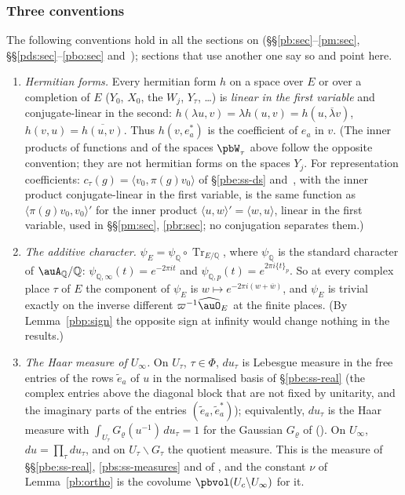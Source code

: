 \documentclass[10pt]{amsart}
\theoremstyle{definition}
\theoremstyle{remark}
\newcommand{\Q}{\mathbb Q}
\providecommand{\auPl}{\Phi}
\providecommand{\aubar}[1]{\overline{#1}}
\begin{document}
\subsubsection*{Three conventions}\label{pb:ss-conv}
The following conventions hold in all the sections on {\cite[Theorem~14.14]{P46}} (\S\S\ref{pb:sec}--\ref{pm:sec},
\S\S\ref{pds:sec}--\ref{pbo:sec} and~{\cite[\S\S2--6]{P52}}); sections that use another one say so and point here.
\begin{enumerate}
\item[(Cv1)] \emph{Hermitian forms.} Every hermitian form $h$ on a space over $E$ or over a completion
of $E$ ($Y_0$, $X_0$, the $W_j$, $Y_\tau$, \dots) is \emph{linear in the first variable} and
conjugate-linear in the second: $h(\lambda u,v)=\lambda h(u,v)=h(u,\aubar\lambda v)$, $h(v,u)=
\aubar{h(u,v)}$. Thus $h(v,e_a^*)$ is the coefficient of $e_a$ in $v$. (The inner products of
functions and of the spaces $\pbW_\tau$ above follow the opposite convention; they are not
hermitian forms on the spaces $Y_j$. For representation coefficients: $c_\tau(g)=\langle v_0,\pi(g)v_0\rangle$
of \S\ref{pbe:ss-ds} and~{\cite[\S3.2]{P49}}, with the inner product conjugate-linear in the first variable, is
the same function as $\langle\pi(g)v_0,v_0\rangle'$ for the inner product $\langle u,w\rangle'=\langle w,u\rangle$,
linear in the first variable, used in \S\S\ref{pm:sec}, \ref{pbr:sec}; no conjugation separates them.)
\item[(Cv2)] \emph{The additive character.} $\psi_E=\psi_\Q\circ\operatorname{Tr}_{E/\Q}$, where
$\psi_\Q$ is the standard character of $\auA_\Q/\Q$: $\psi_{\Q,\infty}(t)=e^{-2\pi it}$ and
$\psi_{\Q,p}(t)=e^{2\pi i\{t\}_p}$. So at every complex place $\tau$ of $E$ the component of $\psi_E$ is
$w\mapsto e^{-2\pi i(w+\aubar w)}$, and $\psi_E$ is trivial exactly on the inverse different
$\varpi^{-1}\widehat\auO_E$ at the finite places. (By Lemma~\ref{pbp:sign} the opposite sign at
infinity would change nothing in the results.)
\item[(Cv3)] \emph{The Haar measure of $U_\infty$.} On $U_\tau$, $\tau\in\auPl$, $du_\tau$ is
Lebesgue measure in the free entries of the rows $\tilde e_a$ of $u$ in the normalised basis of
\S\ref{pbe:ss-real} (the complex entries above the diagonal block that are not fixed by unitarity,
and the imaginary parts of the entries $(\tilde e_a,\tilde e_a^*)$); equivalently, $du_\tau$ is the Haar
measure with $\int_{U_\tau}G_\varrho(u^{-1})\,du_\tau=1$ for the Gaussian $G_\varrho$ of
{\cite[\S4.1]{P52}} ({\cite[Lemma~4.1]{P52}}). On $U_\infty$, $du=\prod_\tau du_\tau$, and on
$U_\tau\backslash G_\tau$ the quotient measure. This is the measure of \S\S\ref{pbe:ss-real},
\ref{pbs:ss-measures} and of {\cite[Lemma~2.19]{P52}}, and the constant $\nu$ of Lemma~\ref{pb:ortho}
is the covolume $\pbvol(U_c\backslash U_\infty)$ for it.
\end{enumerate}
\end{document}
